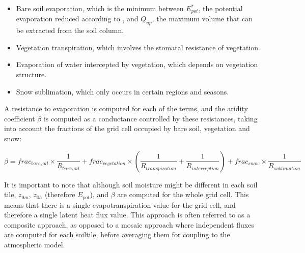 \begin{itemize}
    \item Bare soil evaporation, which is the minimum between $E_{pot}^*$, the potential evaporation reduced according to \citet{milly_potential_1992}, and $Q_{up}$, the maximum volume that can be extracted from the soil column.
    \item Vegetation transpiration, which involves the stomatal resistance of vegetation.
    \item Evaporation of water intercepted by vegetation, which depends on vegetation structure.
    \item Snow sublimation, which only occurs in certain regions and seasons.
\end{itemize}

A resistance to evaporation is computed for each of the terms, and the aridity coefficient $\beta$ is computed as a conductance controlled by these resistances, taking into account the fractions of the grid cell occupied by bare soil, vegetation and snow:

\begin{equation}
    \beta = frac_{bare_soil} \times \frac{1}{R_{bare_soil}} + frac_{vegetation} \times ( \frac{1}{R_{transpiration}} + \frac{1}{R_{interception}} ) + frac_{snow} \times  \frac{1}{R_{sublimation}}
\end{equation}

It is important to note that although soil moisture might be different in each soil tile, $z_{0m}$, $z_{0h}$ (therefore $E_{pot}$), and $\beta$ are computed for the whole grid cell. This means that there is a single evapotranspiration value for the grid cell, and therefore a single latent heat flux value.
This approach is often referred to as a composite approach, as opposed to a mosaic approach where independent fluxes are computed for each soiltile, before averaging them for coupling to the atmospheric model. %


